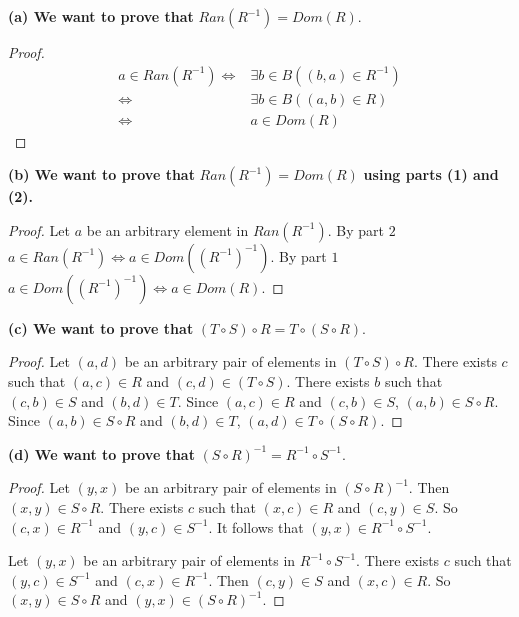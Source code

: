 \textbf{(a) We want to prove that } $Ran(R^{-1}) = Dom(R)$.

\begin{proof} 
    \begin{align*}
        a \in Ran(R^{-1}) \iff & \exists{b \in B}((b, a) \in R^{-1}) \\
        \iff                   & \exists{b \in B}((a, b) \in R)      \\
        \iff                   & a \in Dom(R)
    \end{align*}
\end{proof}

\textbf{(b) We want to prove that } $Ran(R^{-1}) = Dom(R)$ \textbf{ using parts (1) and (2).}

\begin{proof}
    Let $a$ be an arbitrary element in $Ran(R^{-1})$.
    By part $2$ $a \in Ran(R^{-1}) \iff a \in Dom({(R^{-1})}^{-1})$.
    By part $1$ $a \in Dom({(R^{-1})}^{-1}) \iff a \in Dom(R)$.
\end{proof}

\textbf{(c) We want to prove that } $(T \circ S) \circ R = T \circ (S \circ R)$.

\begin{proof}
    Let $(a, d)$ be an arbitrary pair of elements in $(T \circ S) \circ R$.
    There exists $c$ such that $(a, c) \in R$ and $(c, d) \in (T \circ S)$.
    There exists $b$ such that $(c, b) \in S$ and $(b, d) \in T$.
    Since $(a, c) \in R$ and $(c, b) \in S$, $(a, b) \in S \circ R$.
    Since $(a, b) \in S \circ R$ and $(b, d) \in T$, $(a, d) \in T \circ (S \circ R)$.
\end{proof}

\textbf{(d) We want to prove that } ${(S \circ R)}^{-1} = R^{-1} \circ S^{-1}$.

\begin{proof}
    Let $(y, x)$ be an arbitrary pair of elements in ${(S \circ R)}^{-1}$.
    Then $(x, y) \in S \circ R$. There exists $c$ such that $(x, c) \in R$ and $(c, y) \in S$.
    So $(c, x) \in R^{-1}$ and $(y, c) \in S^{-1}$.
    It follows that $(y, x) \in R^{-1} \circ S^{-1}$.

    Let $(y, x)$ be an arbitrary pair of elements in $R^{-1} \circ S^{-1}$. There
    exists $c$ such that $(y, c) \in S^{-1}$ and $(c, x) \in R^{-1}$. Then $(c, y)
        \in S$ and $(x, c) \in R$. So $(x, y) \in S \circ R$ and $(y, x) \in {(S \circ
            R)}^{-1}$.
\end{proof}

